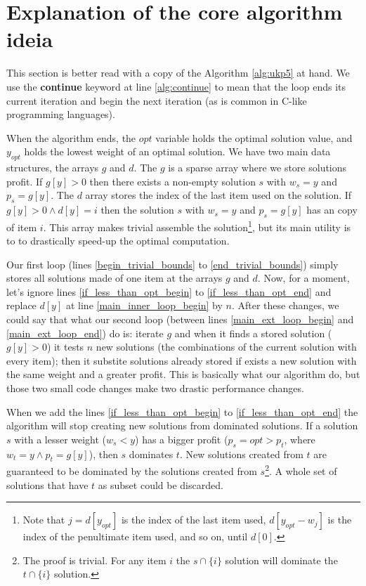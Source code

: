 \documentclass[runningheads,a4paper]{llncs}
\begin{document}
\section{Explanation of the core algorithm ideia}

This section is better read with a copy of the Algorithm \ref{alg:ukp5} at hand. We use the \textbf{continue} keyword at line \ref{alg:continue} to mean that the loop ends its current iteration and begin the next iteration (as is common in C-like programming languages).

When the algorithm ends, the \(opt\) variable holds the optimal solution value, and \(y_{opt}\) holds the lowest weight of an optimal solution. We have two main data structures, the arrays \(g\) and \(d\). The \(g\) is a sparse array where we store solutions profit. If \(g[y] > 0\) then there exists a non-empty solution \(s\) with \(w_s = y\) and \(p_s = g[y]\). The \(d\) array stores the index of the last item used on the solution. If \(g[y] > 0 \land d[y] = i\) then the solution \(s\) with \(w_s = y\) and \(p_s = g[y]\) has an copy of item \(i\). This array makes trivial assemble the solution\footnote{Note that \(j = d[y_{opt}]\) is the index of the last item used, \(d[y_{opt} - w_j]\) is the index of the penultimate item used, and so on, until \(d[0]\).}, but its main utility is to to drastically speed-up the optimal computation.

Our first loop (lines \ref{begin_trivial_bounds} to \ref{end_trivial_bounds}) simply stores all solutions made of one item at the arrays \(g\) and \(d\). Now, for a moment, let's ignore lines \ref{if_less_than_opt_begin} to \ref{if_less_than_opt_end} and replace \(d[y]\) at line \ref{main_inner_loop_begin} by \(n\). After these changes, we could say that what our second loop (between lines \ref{main_ext_loop_begin} and \ref{main_ext_loop_end}) do is: iterate \(g\) and when it finds a stored solution (\(g[y] > 0\)) it tests \(n\) new solutions (the combinations of the current solution with every item); then it substite solutions already stored if exists a new solution with the same weight and a greater profit. This is basically what our algorithm do, but those two small code changes make two drastic performance changes.%

When we add the lines \ref{if_less_than_opt_begin} to \ref{if_less_than_opt_end} the algorithm will stop creating new solutions from dominated solutions. If a solution \(s\) with a lesser weight (\(w_s < y\)) has a bigger profit (\(p_s = opt > p_t\), where \(w_t = y \land p_t = g[y]\)), then \(s\) dominates \(t\). New solutions created from \(t\) are guaranteed to be dominated by the solutions created from \(s\)\footnote{The proof is trivial. For any item \(i\) the \(s \cap \{i\}\) solution will dominate the \(t \cap \{i\}\) solution.}. A whole set of solutions that have \(t\) as subset could be discarded.
\end{document}
